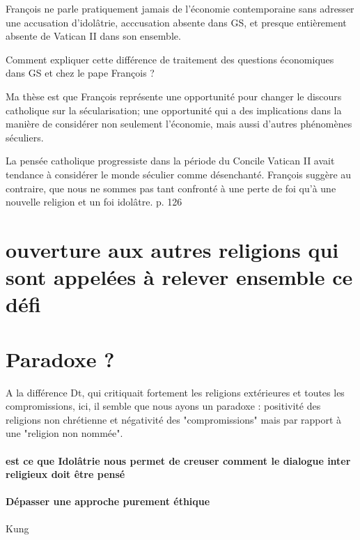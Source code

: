 \begin{singlequote}
François ne parle pratiquement jamais de l’économie contemporaine sans adresser une accusation d’idolâtrie, acccusation absente dans GS, et presque entièrement absente de Vatican II dans son ensemble.

Comment expliquer cette différence de traitement des questions économiques dans GS et chez le pape François ?

Ma thèse est que François représente une opportunité pour changer le discours catholique sur la sécularisation; une opportunité qui a des implications dans la manière de considérer non seulement l’économie, mais aussi d’autres phénomènes séculiers.

La pensée catholique progressiste dans la période du Concile Vatican II avait tendance à considérer le monde séculier comme désenchanté. François suggère au contraire, que nous ne sommes pas tant confronté à une perte de foi qu’à une nouvelle religion et un foi idolâtre. p. 126
\end{singlequote}


\section{ouverture aux autres religions qui sont appelées à relever ensemble ce défi}



\section{Paradoxe ?}
A la différence Dt, qui critiquait fortement les religions extérieures et toutes les compromissions, ici, il semble que nous ayons un paradoxe : positivité des religions non chrétienne et négativité des "compromissions" mais par rapport à une "religion non nommée".


\paragraph{est ce que Idolâtrie nous permet de creuser comment le dialogue inter religieux doit être pensé}

\paragraph{Dépasser une approche purement éthique} Kung

